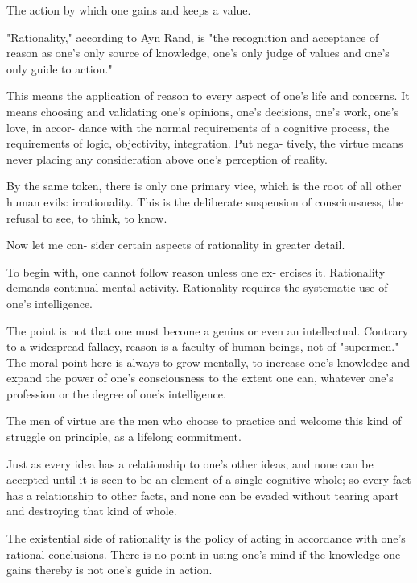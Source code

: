             \begin{definition}[Virtue]
            \label{def:virtue}
                The action by which one gains and keeps a value.
            \end{definition}

        "Rationality," according to Ayn Rand, is "the recognition and acceptance of reason as one's only source of knowledge, one's only judge of values and one's only guide to action."

        This means the application of reason to every aspect of one's life and concerns. It means choosing and validating one's opinions, one's decisions, one's work, one's love, in accor- dance with the normal requirements of a cognitive process, the requirements of logic, objectivity, integration. Put nega- tively, the virtue means never placing any consideration above one's perception of reality. 

        By the same token, there is only one primary vice, which is the root of all other human evils: irrationality. This is the deliberate suspension of consciousness, the refusal to see, to think, to know.

        Now let me con- sider certain aspects of rationality in greater detail.

        To begin with, one cannot follow reason unless one ex- ercises it. Rationality demands continual mental activity. Rationality requires the systematic use of one's intelligence.

        The point is not that one must become a genius or even an intellectual. Contrary to a widespread fallacy, reason is a faculty of human beings, not of "supermen." The moral point here is always to grow mentally, to increase one's knowledge and expand the power of one's consciousness to the extent one can, whatever one's profession or the degree of one's intelligence.

        The men of virtue are the men who choose to practice and welcome this kind of struggle on principle, as a lifelong commitment.

        Just as every idea has a relationship to one's other ideas, and none can be accepted until it is seen to be an element of a single cognitive whole; so every fact has a relationship to other facts, and none can be evaded without tearing apart and destroying that kind of whole.

        The existential side of rationality is the policy of acting in accordance with one's rational conclusions. There is no point in using one's mind if the knowledge one gains thereby is not one's guide in action.


